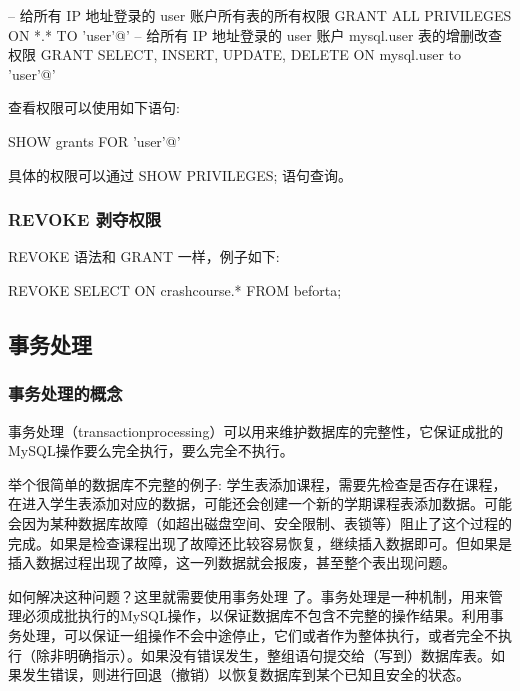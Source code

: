 \begin{sql}
-- 给所有 IP 地址登录的 user 账户所有表的所有权限
GRANT ALL PRIVILEGES ON *.* TO 'user'@'%
-- 给所有 IP 地址登录的 user 账户 mysql.user 表的增删改查权限
GRANT SELECT, INSERT, UPDATE, DELETE ON mysql.user to 'user'@'%
\end{sql}

查看权限可以使用如下语句:
\begin{sql}
SHOW grants FOR 'user'@'%
\end{sql}

具体的权限可以通过 SHOW PRIVILEGES; 语句查询。

\subsubsection{REVOKE 剥夺权限}

REVOKE 语法和 GRANT 一样，例子如下:

\begin{sql}
REVOKE SELECT ON crashcourse.* FROM beforta;
\end{sql}

\subsection{事务处理}


\subsubsection{事务处理的概念}

事务处理（transactionprocessing）可以用来维护数据库的完整性，它保证成批的MySQL操作要么完全执行，要么完全不执行。

举个很简单的数据库不完整的例子: 学生表添加课程，需要先检查是否存在课程，在进入学生表添加对应的数据，可能还会创建一个新的学期课程表添加数据。可能会因为某种数据库故障（如超出磁盘空间、安全限制、表锁等）阻止了这个过程的完成。如果是检查课程出现了故障还比较容易恢复，继续插入数据即可。但如果是插入数据过程出现了故障，这一列数据就会报废，甚至整个表出现问题。

如何解决这种问题？这里就需要使用事务处理 了。事务处理是一种机制，用来管理必须成批执行的MySQL操作，以保证数据库不包含不完整的操作结果。利用事务处理，可以保证一组操作不会中途停止，它们或者作为整体执行，或者完全不执行（除非明确指示）。如果没有错误发生，整组语句提交给（写到）数据库表。如果发生错误，则进行回退（撤销）以恢复数据库到某个已知且安全的状态。

